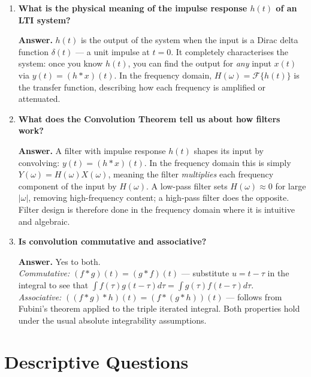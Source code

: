 \documentclass[12pt,a4paper]{article}
\begin{document}
\begin{enumerate}[label=\textbf{Q\arabic*.}, leftmargin=*, itemsep=10pt]
\item \textbf{What is the physical meaning of the impulse response $h(t)$ of an LTI system?}

  \textbf{Answer.} $h(t)$ is the output of the system when the input is a
  Dirac delta function $\delta(t)$ --- a unit impulse at $t=0$. It completely
  characterises the system: once you know $h(t)$, you can find the output
  for \emph{any} input $x(t)$ via $y(t) = (h*x)(t)$. In the frequency domain,
  $H(\omega) = \mathcal{F}\{h(t)\}$ is the transfer function, describing how
  each frequency is amplified or attenuated.

\item \textbf{What does the Convolution Theorem tell us about how filters work?}

  \textbf{Answer.} A filter with impulse response $h(t)$ shapes its input by
  convolving: $y(t) = (h*x)(t)$. In the frequency domain this is simply
  $Y(\omega) = H(\omega)X(\omega)$, meaning the filter \emph{multiplies} each
  frequency component of the input by $H(\omega)$. A low-pass filter sets
  $H(\omega) \approx 0$ for large $|\omega|$, removing high-frequency content;
  a high-pass filter does the opposite. Filter design is therefore done in the
  frequency domain where it is intuitive and algebraic.

\item \textbf{Is convolution commutative and associative?}

  \textbf{Answer.} Yes to both. \\
  \emph{Commutative:} $(f*g)(t) = (g*f)(t)$ --- substitute $u = t-\tau$ in the
  integral to see that $\int f(\tau)g(t-\tau)d\tau = \int g(\tau)f(t-\tau)d\tau$.\\
  \emph{Associative:} $((f*g)*h)(t) = (f*(g*h))(t)$ --- follows from Fubini's
  theorem applied to the triple iterated integral. Both properties hold under
  the usual absolute integrability assumptions.

\end{enumerate}

\section{Descriptive Questions}
\end{document}
